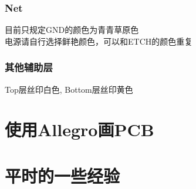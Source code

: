 \documentclass[color=green,mathpazo,titlestyle=hang,11pt]{elegantbook}
\begin{document}
\subsection{Net}
目前只规定\textcolor[rgb]{0,1,0}{GND}的颜色为\textcolor[rgb]{0,1,0}{青青草原色}\\
电源请自行选择鲜艳颜色，可以和ETCH的颜色重复
\subsection{其他辅助层}
\colorbox[rgb]{0.5,0.5,0.5}{\textcolor[rgb]{1,1,1}{Top层丝印白色}}, \colorbox[rgb]{0.5,0.5,0.5}{\textcolor[rgb]{1,1,0}{Bottom层丝印黄色}}
\chapter{使用Allegro画PCB}
\chapter{平时的一些经验}
\end{document}
